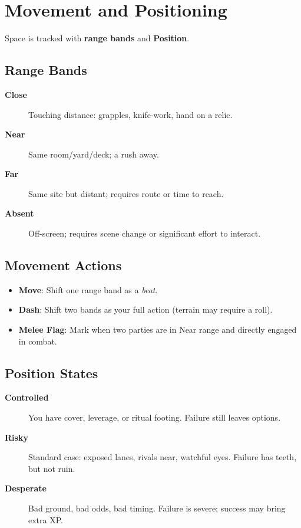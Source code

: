 \section{Movement and Positioning}

Space is tracked with \textbf{range bands} and \textbf{Position}.

\subsection*{Range Bands}
\begin{description}
\item[\textbf{Close}]  Touching distance: grapples, knife-work, hand on a relic.
\item[\textbf{Near}]  Same room/yard/deck; a rush away.
\item[\textbf{Far}]  Same site but distant; requires route or time to reach.
\item[\textbf{Absent}]  Off-screen; requires scene change or significant effort to interact.
\end{description}

\subsection*{Movement Actions}
\begin{itemize}
\item \textbf{Move}: Shift one range band as a \emph{beat}.
\item \textbf{Dash}: Shift two bands as your full action (terrain may require a roll).
\item \textbf{Melee Flag}: Mark when two parties are in Near range and directly engaged in combat.
\end{itemize}

\subsection*{Position States}
\begin{description}
\item[\textbf{Controlled}]  You have cover, leverage, or ritual footing. Failure still leaves options.
\item[\textbf{Risky}]  Standard case: exposed lanes, rivals near, watchful eyes. Failure has teeth, but not ruin.
\item[\textbf{Desperate}]  Bad ground, bad odds, bad timing. Failure is severe; success may bring extra XP.
\end{description}

